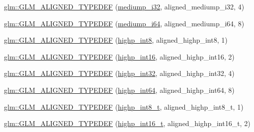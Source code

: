 \begin{DoxyCompactItemize}
\item 
\mbox{\hyperlink{group__gtx__type__aligned_ga63b882e29170d428463d99c3d630acc6}{glm\+::\+G\+L\+M\+\_\+\+A\+L\+I\+G\+N\+E\+D\+\_\+\+T\+Y\+P\+E\+D\+EF}} (\mbox{\hyperlink{group__gtc__type__precision_ga5e00ec824eb55968a6b6496f294d8c07}{mediump\+\_\+i32}}, aligned\+\_\+mediump\+\_\+i32, 4)
\item 
\mbox{\hyperlink{group__gtx__type__aligned_ga8b20507bb048c1edea2d441cc953e6f0}{glm\+::\+G\+L\+M\+\_\+\+A\+L\+I\+G\+N\+E\+D\+\_\+\+T\+Y\+P\+E\+D\+EF}} (\mbox{\hyperlink{group__gtc__type__precision_ga90fedf6c701ffbe00535156715e50787}{mediump\+\_\+i64}}, aligned\+\_\+mediump\+\_\+i64, 8)
\item 
\mbox{\hyperlink{group__gtx__type__aligned_ga56c5ca60813027b603c7b61425a0479d}{glm\+::\+G\+L\+M\+\_\+\+A\+L\+I\+G\+N\+E\+D\+\_\+\+T\+Y\+P\+E\+D\+EF}} (\mbox{\hyperlink{group__gtc__type__precision_ga57c86999e666760c304453f9bfdc09d1}{highp\+\_\+int8}}, aligned\+\_\+highp\+\_\+int8, 1)
\item 
\mbox{\hyperlink{group__gtx__type__aligned_ga7a751b3aff24c0259f4a7357c2969089}{glm\+::\+G\+L\+M\+\_\+\+A\+L\+I\+G\+N\+E\+D\+\_\+\+T\+Y\+P\+E\+D\+EF}} (\mbox{\hyperlink{group__gtc__type__precision_gaf0430ed80e88c0d1dfbe47f359659c81}{highp\+\_\+int16}}, aligned\+\_\+highp\+\_\+int16, 2)
\item 
\mbox{\hyperlink{group__gtx__type__aligned_ga70cd2144351c556469ee6119e59971fc}{glm\+::\+G\+L\+M\+\_\+\+A\+L\+I\+G\+N\+E\+D\+\_\+\+T\+Y\+P\+E\+D\+EF}} (\mbox{\hyperlink{group__gtc__type__precision_gaa2045c92b9553d463191af6a20e997bb}{highp\+\_\+int32}}, aligned\+\_\+highp\+\_\+int32, 4)
\item 
\mbox{\hyperlink{group__gtx__type__aligned_ga46bbf08dc004d8c433041e0b5018a5d3}{glm\+::\+G\+L\+M\+\_\+\+A\+L\+I\+G\+N\+E\+D\+\_\+\+T\+Y\+P\+E\+D\+EF}} (\mbox{\hyperlink{group__gtc__type__precision_ga7ffb27943e9569800979081bc548621c}{highp\+\_\+int64}}, aligned\+\_\+highp\+\_\+int64, 8)
\item 
\mbox{\hyperlink{group__gtx__type__aligned_gab3e10c77a20d1abad2de1c561c7a5c18}{glm\+::\+G\+L\+M\+\_\+\+A\+L\+I\+G\+N\+E\+D\+\_\+\+T\+Y\+P\+E\+D\+EF}} (\mbox{\hyperlink{group__gtc__type__precision_ga417701b99e6e7992f35ab2ef694f88b2}{highp\+\_\+int8\+\_\+t}}, aligned\+\_\+highp\+\_\+int8\+\_\+t, 1)
\item 
\mbox{\hyperlink{group__gtx__type__aligned_ga968f30319ebeaca9ebcd3a25a8e139fb}{glm\+::\+G\+L\+M\+\_\+\+A\+L\+I\+G\+N\+E\+D\+\_\+\+T\+Y\+P\+E\+D\+EF}} (\mbox{\hyperlink{group__gtc__type__precision_ga07d318d61472e75238e53b9642227672}{highp\+\_\+int16\+\_\+t}}, aligned\+\_\+highp\+\_\+int16\+\_\+t, 2)

\end{DoxyCompactItemize}
